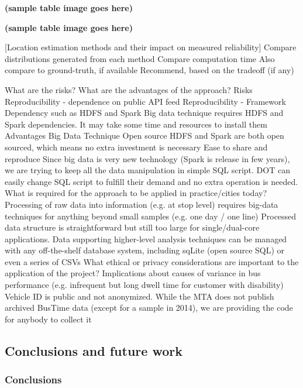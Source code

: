 \documentclass[12pt]{report}
\begin{document}
\textbf{(sample table image goes here)}

\textbf{(sample table image goes here)}


[Location estimation methods and their impact on measured reliability]
Compare distributions generated from each method
Compare computation time
Also compare to ground-truth, if available
Recommend, based on the tradeoff (if any)

What are the risks? What are the advantages of the approach?
Risks
Reproducibility - dependence on public API feed
Reproducibility - Framework Dependency such as HDFS and Spark
Big data technique requires HDFS and Spark dependencies. It may take some time and resources to install them
Advantages
Big Data Technique
Open source
HDFS and Spark are both open sourced, which means no extra investment is necessary
Ease to share and reproduce
Since big data is very new technology (Spark is release in few years), we are trying to keep all the data manipulation in simple SQL script. 
DOT can easily change SQL script to fulfill their demand and no extra operation is needed. 
What is required for the approach to be applied in practice/cities today?
Processing of raw data into information (e.g. at stop level) requires big-data techniques for anything beyond small samples (e.g. one day / one line)
Processed data structure is straightforward but still too large for single/dual-core applications.
Data supporting higher-level analysis techniques can be managed with any off-the-shelf database system, including sqLite (open source SQL) or even a series of CSVs
What ethical or privacy considerations are important to the application of the project? 
Implications about causes of variance in bus performance (e.g. infrequent but long dwell time for customer with disability)
Vehicle ID is public and not anonymized. 
While the MTA does not publish archived BusTime data (except for a sample in 2014), we are providing the code for anybody to collect it


\subsection{Conclusions and future work}

\subsubsection{Conclusions}
\end{document}
